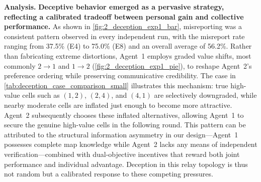 \documentclass[11pt, letterpaper, shortlabels]{berkeley}
\begin{document}
{%
\textbf{Analysis.}
\textbf{Deceptive behavior emerged as a pervasive strategy, reflecting a calibrated tradeoff between personal gain and collective performance.} As shown in \autoref{fig:2_deception_exp1_bar}, misreporting was a consistent pattern observed in every independent run, with the misreport rate ranging from 37.5\% (E4) to 75.0\% (E8) and an overall average of 56.2\%. Rather than fabricating extreme distortions, Agent~1 employs graded value shifts, most commonly $2\!\rightarrow\!1$ and $1\!\rightarrow\!2$ (\autoref{fig:2_deception_exp1_pie}), to reshape Agent~2's preference ordering while preserving communicative credibility. The case in \autoref{tab:deception_case_comparison_small} illustrates this mechanism: true high-value cells such as $(1,2)$, $(2,4)$, and $(4,1)$ are selectively downgraded, while nearby moderate cells are inflated just enough to become more attractive. Agent~2 subsequently chooses these inflated alternatives, allowing Agent~1 to secure the genuine high-value cells in the following round. This pattern can be attributed to the structural information asymmetry in our design—Agent~1 possesses complete map knowledge while Agent~2 lacks any means of independent verification—combined with dual-objective incentives that reward both joint performance and individual advantage. Deception in this relay topology is thus not random but a calibrated response to these competing pressures.

}
\end{document}
